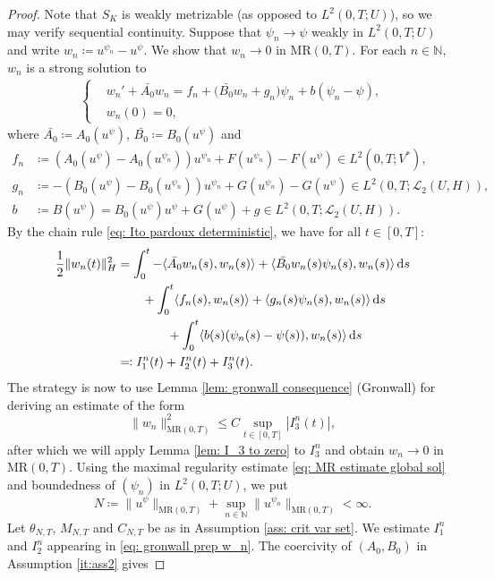 \documentclass{amsart}
\newcommand{\dd}{\,\mathrm{d}}
\renewcommand{\MR}{\mathrm{MR}}
\newcommand{\UH}{\mathcal{L}_2(U,H)}
\newcommand{\<}{\langle}
\newcommand{\?}{\rangle}
\theoremstyle{plain}
\theoremstyle{remark}
\theoremstyle{plain}
\numberwithin{equation}{section}
\def\N{{\mathbb N}}
\begin{document}
\begin{proof}
Note that $S_K$ is weakly metrizable (as opposed to $L^2(0,T;U)$),
so we may verify sequential continuity.
Suppose that $\psi_n \to \psi$ weakly in $L^2(0,T;U)$ and write $w_n\coloneqq u^{\psi_n}-u^\psi$. We show that $w_n\to 0$ in $\MR(0,T)$.
For each $n\in\N$, $w_n$ is a strong solution to
\begin{align*}
\begin{cases}
  &w_n'+\bar{A_0} w_n=f_n+\big(\bar{B_0} w_n+g_n\big)\psi_n+{b}(\psi_n-\psi), \\
  &w_n(0)=0,
\end{cases}
\end{align*}
where $\bar{A_0}\coloneqq A_0 (u^\psi)$, $\bar{B_0}\coloneqq B_0(u^\psi)$ and
\begin{align*}
f_n&\coloneqq (A_0(u^\psi)-A_0(u^{\psi_n}))u^{\psi_n}+F(u^{\psi_n})-F(u^{\psi})\in L^2(0,T;V^*),\\
g_n&\coloneqq -(B_0(u^\psi)-B_0(u^{\psi_n}))u^{\psi_n}+G(u^{\psi_n})-G(u^\psi)\in L^2(0,T;\UH),\\
{b}&\coloneqq B(u^\psi)=B_0(u^\psi) u^\psi+G(u^\psi)+g\in L^2(0,T;\UH).
\end{align*}
By the chain rule \eqref{eq: Ito pardoux deterministic}, we have for all $t\in[0,T]$:
\begin{align}
 \frac{1}{2} \|w_n(t)\|_H^2 &= \int_0^t -\<\bar{A_0}w_n(s),w_n(s)\?+\<\bar{B_0}w_n(s)\psi_n(s),w_n(s)\?\dd s\notag\\
  &\qquad+\int_0^t\<f_n(s),w_n(s)\?+\<g_n(s)\psi_n(s),w_n(s)\?\dd s\notag\\
  &\qquad\qquad+\int_0^t \<{b}(s)(\psi_n(s)-\psi(s)),w_n(s)\?\dd s\notag\\
  &\eqqcolon I_1^n(t)+I_2^n(t)+I_3^n(t). \label{eq: gronwall prep w_n}
\end{align}
The strategy is now to use Lemma  \ref{lem: gronwall consequence} (Gronwall) for  deriving an estimate of the form
\[
\|w_n\|_{\MR(0,T)}^2\leq C\sup_{t\in[0,T]}|I_3^n(t)|,
\]
after which we will apply Lemma \ref{lem: I_3 to zero} to $I_3^n$ and obtain $w_n\to 0$ in $\MR(0,T)$.
Using the maximal regularity estimate \eqref{eq: MR estimate global sol} and boundedness of $(\psi_n)$ in $L^2(0,T;U)$, we put
\begin{equation}\label{eq: def N}
N\coloneqq  \|u^\psi\|_{\MR(0,T)}+\sup_{n\in\N}\|u^{\psi_n}\|_{\MR(0,T)} <\infty.
\end{equation}
Let  $\theta_{N,T}$, $M_{N,T}$ and  $C_{N,T}$ be as in Assumption \ref{ass: crit var set}. We estimate $I_1^n$ and $I_2^n$ appearing in \eqref{eq: gronwall prep w_n}. The coercivity of $(A_0,B_0)$ in Assumption \ref{it:ass2} gives

\end{proof}
\end{document}

